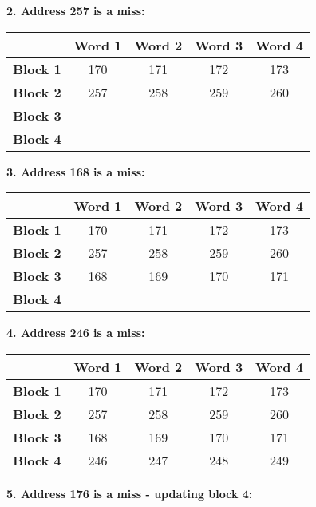 \documentclass[a4paper, 11pt]{exam}
\begin{document}
\begin{enumerate}
\textbf{2. Address 257 is a miss:}

\begin{center}
	\begin{tabular}{ |c|c|c|c|c| } 
		\hline
		&\textbf{Word 1}& \textbf{Word 2}& \textbf{Word 3} & \textbf{Word 4}\\ 
		\hline
		\textbf{Block 1} & 170 & 171  & 172 & 173\\ 
		\hline
		\textbf{Block 2} & 257 & 258  & 259 & 260\\ 
		\hline
		\textbf{Block 3} &  &   &  &\\ 
		\hline
		\textbf{Block 4} &  &   &  &\\ 
		\hline
	\end{tabular}
\end{center}

\textbf{3. Address 168 is a miss:}

\begin{center}
	\begin{tabular}{ |c|c|c|c|c| } 
		\hline
		&\textbf{Word 1}& \textbf{Word 2}& \textbf{Word 3} & \textbf{Word 4}\\ 
		\hline
		\textbf{Block 1} & 170 & 171  & 172 & 173\\ 
		\hline
		\textbf{Block 2} & 257 & 258  & 259 & 260\\ 
		\hline
		\textbf{Block 3} & 168 &  169 & 170 & 171\\ 
		\hline
		\textbf{Block 4} &  &   &  &\\ 
		\hline
	\end{tabular}
\end{center}

\textbf{4. Address 246 is a miss:}

\begin{center}
	\begin{tabular}{ |c|c|c|c|c| } 
		\hline
		&\textbf{Word 1}& \textbf{Word 2}& \textbf{Word 3} & \textbf{Word 4}\\ 
		\hline
		\textbf{Block 1} & 170 & 171  & 172 & 173\\ 
		\hline
		\textbf{Block 2} & 257 & 258  & 259 & 260\\ 
		\hline
		\textbf{Block 3} & 168 &  169 & 170 & 171\\ 
		\hline
		\textbf{Block 4} & 246 & 247  & 248 & 249\\ 
		\hline
	\end{tabular}
\end{center}

\textbf{5. Address 176 is a miss - updating block 4:}


\end{enumerate}
\end{document}
